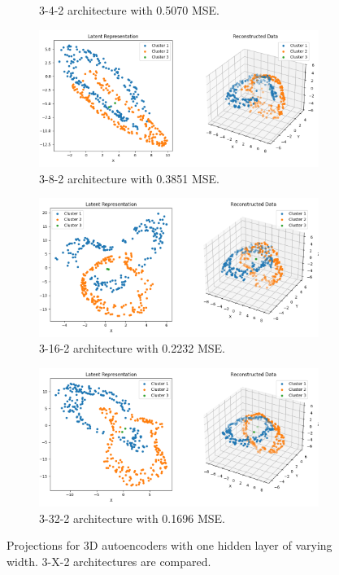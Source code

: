 \begin{figure}[htb]
\begin{subfigure}[b]{0.49\textwidth}
    \caption{3-4-2 architecture with 0.5070 MSE.}
    \label{fig:3-4-2}
  \end{subfigure}
  \hfill
  \begin{subfigure}[b]{0.49\textwidth}
    \centering
    \includegraphics[width=\linewidth]{images/RQ1/3-8-2_0.3851.png}
    \caption{3-8-2 architecture with 0.3851 MSE.}
    \label{fig:3-8-2}
  \end{subfigure}
  \hfill  
  \begin{subfigure}[b]{0.49\textwidth}
    \centering
    \includegraphics[width=\linewidth]{images/RQ1/3-16-2_0.2232.png}
    \caption{3-16-2 architecture with 0.2232 MSE.}
    \label{fig:3-16-2}
  \end{subfigure}
  \hfill  
  \begin{subfigure}[b]{0.49\textwidth}
    \centering
    \includegraphics[width=\linewidth]{images/RQ1/3-32-2_0.1696.png}
    \caption{3-32-2 architecture with 0.1696 MSE.}
    \label{fig:3-32-2}
  \end{subfigure}

  \caption{Projections for 3D autoencoders with one hidden layer of varying width. 3-X-2 architectures are compared.}
  \label{fig:3-X-2}
\end{figure}

